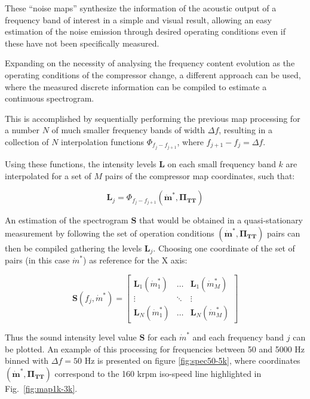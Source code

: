 These ``noise maps'' synthesize the information of the acoustic output of a frequency band of interest in a simple and visual result, allowing an easy estimation of the noise emission through desired operating conditions even if these have not been specifically measured.

Expanding on the necessity of analysing the frequency content evolution as the operating conditions of the compressor change, a different approach can be used, where the measured discrete information can be compiled to estimate a continuous spectrogram.

This is accomplished by sequentially performing the previous map processing for a number $N$ of much smaller frequency bands of width $\Delta f$, resulting in a collection of $N$ interpolation functions $\Phi_{f_j-f_{j+1}}$, where $f_{j+1}-f_j = \Delta f$.

Using these functions, the intensity levels $\mathbf L$ on each small frequency band $k$ are interpolated for a set of $M$ pairs of the compressor map coordinates, such that:

\begin{equation}
 \mathbf L_j=\Phi_{f_j-f_{j+1}}(\bm{\dot m^*},\bm{\Pi_\text{TT}})
\end{equation}

An estimation of the spectrogram $\mathbf S$ that would be obtained in a quasi-stationary measurement by following the set of operation conditions $(\bm{\dot m^*},\bm{\Pi_\text{TT}})$ pairs can then be compiled gathering the levels $\mathbf L_j$. Choosing one coordinate of the set of pairs (in this case $\dot m^*$) as reference for the X axis:

\begin{equation}
  \mathbf S(f_j,\dot m^*)=\begin{bmatrix}
    \mathbf L_1(\dot m^*_1) & \hdots & \mathbf L_1(\dot m^*_M)\\
    \vdots & \ddots & \vdots \\
    \mathbf L_N(\dot m^*_1) & \hdots & \mathbf L_N(\dot m^*_M)
  \end{bmatrix}
\end{equation}

Thus the sound intensity level value $\mathbf S$ for each $\dot m^*$ and each frequency band $j$ can be plotted. An example of this processing for frequencies between 50 and 5000 Hz binned with $\Delta f = 50$ Hz is presented on figure \ref{fig:spec50-5k}, where coordinates $(\bm{\dot{m}^*},\bm{\Pi_\text{TT}})$ correspond to the 160 krpm iso-speed line highlighted in Fig.~\ref{fig:map1k-3k}.

